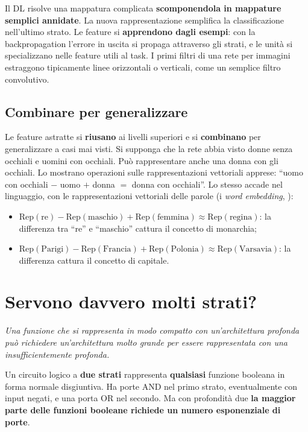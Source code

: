 Il DL risolve una mappatura complicata \textbf{scomponendola in mappature semplici annidate}. La nuova
rappresentazione semplifica la classificazione nell'ultimo strato. Le feature si \textbf{apprendono dagli
esempi}: con la backpropagation l'errore in uscita si propaga attraverso gli strati, e le unità si specializzano
nelle feature utili al task. I primi filtri di una rete per immagini estraggono tipicamente linee orizzontali o
verticali, come un semplice filtro convolutivo.

\subsection{Combinare per generalizzare}

Le feature astratte si \textbf{riusano} ai livelli superiori e si \textbf{combinano} per generalizzare a casi mai
visti. Si supponga che la rete abbia visto donne senza occhiali e uomini con occhiali. Può rappresentare anche una
donna con gli occhiali. Lo mostrano operazioni sulle rappresentazioni vettoriali apprese: ``uomo con occhiali
$-$ uomo $+$ donna $=$ donna con occhiali''. Lo stesso accade nel linguaggio, con le rappresentazioni vettoriali
delle parole (i \emph{word embedding}, ):
\begin{itemize}
  \item $\mathrm{Rep}(\text{re}) - \mathrm{Rep}(\text{maschio}) + \mathrm{Rep}(\text{femmina})\approx\mathrm{Rep}(\text{regina})$:
        la differenza tra ``re'' e ``maschio'' cattura il concetto di monarchia;
  \item $\mathrm{Rep}(\text{Parigi}) - \mathrm{Rep}(\text{Francia}) + \mathrm{Rep}(\text{Polonia})\approx\mathrm{Rep}(\text{Varsavia})$:
        la differenza cattura il concetto di capitale.
\end{itemize}

\section{Servono davvero molti strati?}
\label{sec:no-flattening}

\begin{idea}[No-flattening]
\emph{Una funzione che si rappresenta in modo compatto con un'architettura profonda può richiedere un'architettura
molto grande per essere rappresentata con una insufficientemente profonda.}
\end{idea}

Un circuito logico a \textbf{due strati} rappresenta \textbf{qualsiasi} funzione booleana in forma normale
disgiuntiva. Ha porte AND nel primo strato, eventualmente con input negati, e una porta OR nel secondo. Ma con
profondità due \textbf{la maggior parte delle funzioni booleane richiede un numero esponenziale di porte}.

